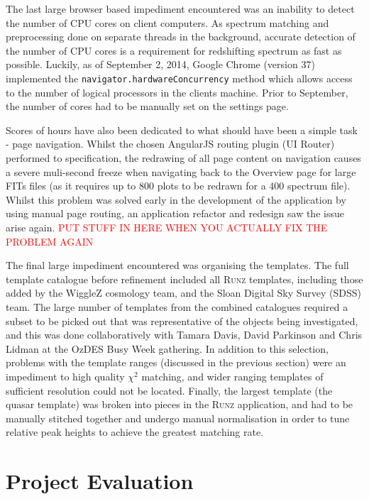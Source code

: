 \documentclass[titlesmallcaps, examinerscopy, copyrightpage]{uqthesis}
\newcommand{\runz}{\textsc{Runz}}
\begin{document}
The last large browser based impediment encountered was an inability to detect the number of CPU cores on client computers. As spectrum matching and preprocessing done on separate threads in the background, accurate detection of the number of CPU cores is a requirement for redshifting spectrum as fast as possible. Luckily, as of September 2, 2014, Google Chrome (version 37) implemented the \verb+navigator.hardwareConcurrency+ method \cite{chrome1,chrome2} which allows access to the number of logical processors in the clients machine. Prior to September, the number of cores had to be manually set on the settings page.

Scores of hours have also been dedicated to what should have been a simple task - page navigation. Whilst the chosen AngularJS routing plugin (UI Router) performed to specification, the redrawing of all page content on navigation causes a severe muli-second freeze when navigating back to the Overview page for large FITs files (as it requires up to 800 plots to be redrawn for a 400 spectrum file). Whilst this problem was solved early in the development of the application by using manual page routing, an application refactor and redesign saw the issue arise again. \textcolor{red}{PUT STUFF IN HERE WHEN YOU ACTUALLY FIX THE PROBLEM AGAIN}

The final large impediment encountered was organising the templates. The full template catalogue before refinement included all \runz{} templates, including those added by the WiggleZ cosmology team, and the Sloan Digital Sky Survey (SDSS) team. The large number of templates from the combined catalogues required a subset to be picked out that was representative of the objects being investigated, and this was done collaboratively with Tamara Davis, David Parkinson and Chris Lidman at the OzDES Busy Week gathering. In addition to this selection, problems with the template ranges (discussed in the previous section) were an impediment to high quality $\chi^2$ matching, and wider ranging templates of sufficient resolution could not be located. Finally, the largest template (the quasar template) was broken into pieces in the \runz{} application, and had to be manually stitched together and undergo manual normalisation in order to tune relative peak heights to achieve the greatest matching rate.





\chapter{Project Evaluation}
\end{document}
